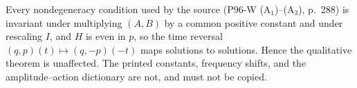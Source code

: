 \medskip
\begin{remark}\label{bpW:w0:harmless}
Every nondegeneracy condition used by the source (P96-W (A$_1$)--(A$_3$), p.~288) is invariant under multiplying
$(A,B)$ by a common positive constant and under rescaling $I$, and $H$ is even in $p$, so the time reversal
$(q,p)(t)\mapsto(q,-p)(-t)$ maps solutions to solutions. Hence the qualitative theorem is unaffected. The printed
constants, frequency shifts, and the amplitude--action dictionary are not, and must not be copied.
\end{remark}

